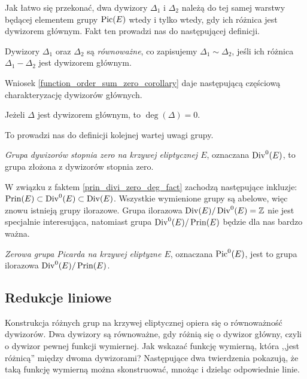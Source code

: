 Jak łatwo się przekonać,
dwa dywizory $\Delta_1$ i $\Delta_2$ należą do tej samej warstwy
będącej elementem grupy $\operatorname{Pic}(E)$
wtedy i tylko wtedy, gdy ich różnica jest dywizorem głównym.
Fakt ten prowadzi nas do następującej definicji.

\begin{definition}
Dywizory $\Delta_1$ oraz $\Delta_2$ są \emph{równoważne},
co zapisujemy $\Delta_1 \sim \Delta_2$,
jeśli ich różnica $\Delta_1 - \Delta_2$ jest dywizorem głównym.
\end{definition}

Wniosek \ref{function_order_sum_zero_corollary}
daje następującą częściową charakteryzację dywizorów głównych.

\begin{fact}\label{prin_divi_zero_deg_fact}
Jeżeli $\Delta$ jest dywizorem głównym,
to $\deg(\Delta) = 0$.
\end{fact}

To prowadzi nas do definicji kolejnej wartej uwagi grupy.

\begin{definition}
\emph{Grupa dywizorów stopnia zero na krzywej eliptycznej $E$},
oznaczana $\operatorname{Div}^0(E)$,
to grupa złożona z dywizorów stopnia zero.
\end{definition}

W związku z faktem \ref{prin_divi_zero_deg_fact}
zachodzą następujące inkluzje:
$\operatorname{Prin}(E) \subset \operatorname{Div}^0(E) \subset \operatorname{Div}(E)$.
Wszystkie wymienione grupy są abelowe,
więc znowu istnieją grupy ilorazowe.
Grupa ilorazowa $\operatorname{Div}(E) / \operatorname{Div}^0(E) = \mathbb{Z}$
nie jest specjalnie interesująca,
natomiast grupa $\operatorname{Div}^0(E) / \operatorname{Prin}(E)$
będzie dla nas bardzo ważna.

\begin{definition}
\emph{Zerowa grupa Picarda na krzywej eliptyzne $E$},
oznaczana $\operatorname{Pic}^0(E)$,
jest to grupa ilorazowa $\operatorname{Div}^0(E) / \operatorname{Prin}(E)$.
\end{definition}

\subsection*{Redukcje liniowe}

Konstrukcja różnych grup na krzywej eliptycznej opiera się
o równoważność dywizorów. Dwa dywizory są równoważne,
gdy różnią się o dywizor główny, czyli o dywizor pewnej funkcji wymiernej.
Jak wskazać funkcję wymierną, która ,,jest różnicą'' między dwoma dywizorami?
Następujące dwa twierdzenia pokazują, że taką funkcję wymierną
można skonstruować, mnożąc i dzieląc odpowiednie linie.

